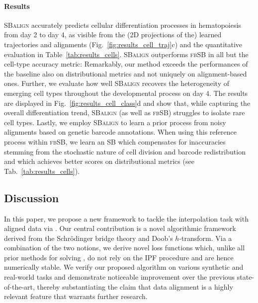 \paragraph{Results} \textsc{SBalign} accurately predicts cellular differentiation processes in hematopoiesis from day 2 to day 4, as visible from the (2D projections of the) learned trajectories and alignments (Fig.~\ref{fig:results_cell_traj}c) and the quantitative evaluation in Table~\ref{tab:results_cells}. \textsc{SBalign} outperforms \textsc{fbSB} in all but the cell-type accuracy metric: Remarkably, our method exceeds the performances of the baseline also on distributional metrics and not uniquely on alignment-based ones. Further, we evaluate how well \textsc{SBalign} recovers the heterogeneity of emerging cell types throughout the developmental process on day 4. The results are displayed in Fig.~\ref{fig:results_cell_class}d and show that, while capturing the overall differentiation trend, \textsc{SBalign} (as well as \textsc{fbSB}) struggles to isolate rare cell types.
Lastly, we employ \textsc{SBalign} to learn a prior process from noisy alignments based on genetic barcode annotations. When using this reference process within \textsc{fbSB}, we learn an SB which compensates for inaccuracies stemming from the stochastic nature of cell division and barcode redistribution and which achieves better scores on distributional metrics (see Tab.~\ref{tab:results_cells}).

\subsection{Discussion}

\vspace{-5pt}
In this paper, we propose a new framework to tackle the interpolation task with aligned data via . Our central contribution is a novel algorithmic framework derived from the Schr\"odinger bridge theory and Doob's $h$-transform. Via a combination of the two notions, we derive novel loss functions which, unlike all prior methods for solving , do not rely on the \acrlong{IPF} procedure and are hence numerically stable. We verify our proposed algorithm on various synthetic and real-world tasks and demonstrate noticeable improvement over the previous state-of-the-art, thereby substantiating the claim that data alignment is a highly relevant feature that warrants further research.

